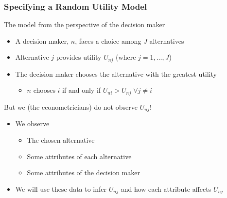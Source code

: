 \documentclass{beamer}\usepackage[]{graphicx}\usepackage[]{xcolor}
\begin{document}
\begin{frame}\frametitle{Specifying a Random Utility Model}
	The model from the perspective of the decision maker
	\begin{itemize}
		\item A decision maker, $n$, faces a choice among $J$ alternatives
    	\item Alternative $j$ provides utility $U_{nj}$ (where $j = 1, \ldots, J$)
    	\item The decision maker chooses the alternative with the greatest utility
    	\begin{itemize}
    		\item $n$ chooses $i$ if and only if $U_{ni} > U_{nj} \; \forall j \neq i$
    	\end{itemize}
   	\end{itemize}
   	\vspace{3ex}
   	But we (the econometricians) do not observe $U_{nj}$!
   	\begin{itemize}
   		\item We observe
   		\begin{itemize}
   			\item The chosen alternative
   			\item Some attributes of each alternative
   			\item Some attributes of the decision maker
   		\end{itemize}
   		\item We will use these data to infer $U_{nj}$ and how each attribute affects $U_{nj}$
   	\end{itemize}
\end{frame}
\end{document}
